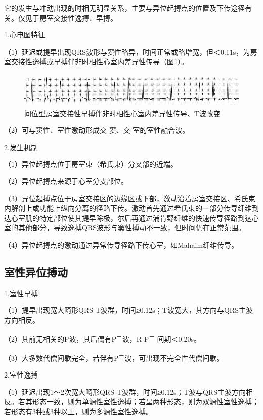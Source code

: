 它的发生与冲动出现的时相无明显关系，主要与异位起搏点的位置及下传途径有关。仅见于房室交接性逸搏、早搏。

1.心电图特征

（1）延迟或提早出现QRS波形与窦性略异，时间正常或略增宽，但＜0.11s，为房室交接性逸搏或早搏伴非时相性心室内差异性传导（图\ref{fig3-16}）。

\begin{figure}[!htbp]
 \centering
 \includegraphics[width=5.58333in,height=0.66667in]{./images/Image00066.jpg}
 \captionsetup{justification=centering}
 \caption{间位型房室交接性早搏伴非时相性心室内差异性传导、T波改变}
 \label{fig3-16}
  \end{figure} 

（2）可与窦性、室性激动形成交-窦、交-室的室性融合波。

2.发生机制

（1）异位起搏点位于房室束（希氏束）分叉部的近端。

（2）异位起搏点来源于心室分支部位。

（3）异位起搏点位于房室交接区的边缘区或下部，激动沿着房室交接区、希氏束内解剖上或功能上纵向分离的径路下传。激动首先通过希氏束的一部分传导纤维到达心室肌的特定部位使其提早除极，尔后再通过浦肯野纤维的快速传导径路到达心室的其他部分，导致逸搏QRS波形与窦性搏动不一致，但时间仍在正常范围。

（4）异位起搏点的激动通过异常传导径路下传心室，如Mahaim纤维传导。

\protect\hypertarget{text00009.htmlux5cux23subid60}{}{}

\subsection{室性异位搏动}

1.室性早搏

（1）提早出现宽大畸形QRS-T波群，时间≥0.12s；T波宽大，其方向与QRS主波方向相反。

（2）其前无相关的P波，其后偶有P\textsuperscript{－}波，R-P\textsuperscript{－} 间期＜0.20s。

（3）大多数代偿间歇完全，若伴有P\textsuperscript{－}波，可出现不完全性代偿间歇。

2.室性逸搏

（1）延迟出现1～2次宽大畸形QRS-T波群，时间≥0.12s；T波与QRS主波方向相反。若其形态一致，则为单源性室性逸搏；若呈两种形态，则为双源性室性逸搏；若形态有3种或3种以上，则为多源性室性逸搏。

